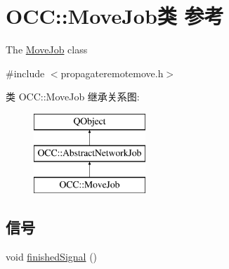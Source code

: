 \hypertarget{class_o_c_c_1_1_move_job}{}\section{O\+CC\+:\+:Move\+Job类 参考}
\label{class_o_c_c_1_1_move_job}


The \hyperlink{class_o_c_c_1_1_move_job}{Move\+Job} class  




{\ttfamily \#include $<$propagateremotemove.\+h$>$}

类 O\+CC\+:\+:Move\+Job 继承关系图\+:\begin{figure}[H]
\begin{center}
\leavevmode
\includegraphics[height=3.000000cm]{class_o_c_c_1_1_move_job}
\end{center}
\end{figure}
\subsection*{信号}
\begin{DoxyCompactItemize}
\item 
void \hyperlink{class_o_c_c_1_1_move_job_aa43a14cadfe36d5ce2f4c9954be557a5}{finished\+Signal} ()
\end{DoxyCompactItemize}
